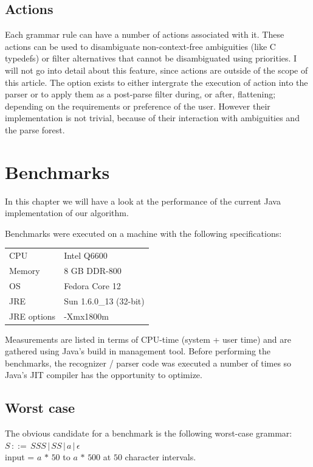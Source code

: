 \documentclass[a4paper,10pt]{article}
\begin{document}
\subsection{Actions}

Each grammar rule can have a number of actions associated with it. These actions can be used to disambiguate non-context-free ambiguities (like C typedefs) or filter alternatives that cannot be disambiguated using priorities. I will not go into detail about this feature, since actions are outside of the scope of this article. The option exists to either intergrate the execution of action into the parser or to apply them as a post-parse filter during, or after, flattening; depending on the requirements or preference of the user. However their implementation is not trivial, because of their interaction with ambiguities and the parse forest.

\section{Benchmarks}

In this chapter we will have a look at the performance of the current Java implementation of our algorithm.

Benchmarks were executed on a machine with the following specifications:
\begin{table}[H]
\centering
\begin{tabular}{ | p{6em} | p{9em} | }
 \hline
 CPU & Intel Q6600 \\
 Memory & 8 GB DDR-800 \\
 OS & Fedora Core 12 \\
 JRE & Sun 1.6.0\_13 (32-bit) \\
 JRE options & -Xmx1800m \\
 \hline
\end{tabular}
\end{table}

Measurements are listed in terms of CPU-time (system + user time) and are gathered using Java's build in management tool. Before performing the benchmarks, the recognizer / parser code was executed a number of times so Java's JIT compiler has the opportunity to optimize.

\subsection{Worst case}

The obvious candidate for a benchmark is the following worst-case grammar:
$S\,::=\,SSS\,|\,SS\,|\,a\,|\,\epsilon$\\
input = $a\,*\,50$ to $a\,*\,500$ at $50$ character intervals.
\end{document}
